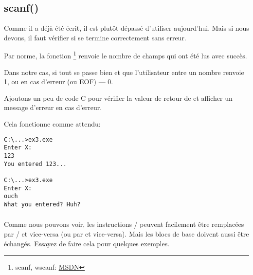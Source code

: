 \subsection{scanf()}

Comme il a déjà été écrit, il est plutôt dépassé d'utiliser \scanf aujourd'hui.
Mais si nous devons, il faut vérifier si \scanf se termine correctement sans erreur.



Par norme, la fonction \scanf\footnote{scanf, wscanf: \href{http://msdn.microsoft.com/en-us/library/9y6s16x1(VS.71).aspx}{MSDN}}
renvoie le nombre de champs qui ont été lus avec succès.

Dans notre cas, si tout se passe bien et que l'utilisateur entre un nombre \scanf
renvoie 1, ou en cas d'erreur (ou \ac{EOF}) --- 0.

Ajoutons un peu de code C pour vérifier la valeur de retour de \scanf et afficher
un message d'erreur en cas d'erreur.

Cela fonctionne comme attendu:

\begin{lstlisting}
C:\...>ex3.exe
Enter X:
123
You entered 123...

C:\...>ex3.exe
Enter X:
ouch
What you entered? Huh?
\end{lstlisting}






\subsubsection{\Exercise}

Comme nous pouvons voir, les instructions / peuvent facilement
être remplacées par / et vice-versa (ou  par  et vice-versa).
Mais les blocs de base doivent aussi être échangés.
Essayez de faire cela pour quelques exemples.

